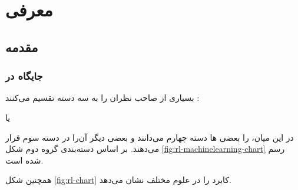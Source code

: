 \chapter{معرفی }\label{ch:rl}
\section{مقدمه}
\subsection{جایگاه  در }
بسیاری از صاحب نظران  را به سه دسته تقسیم می‌کنند :
\begin{enuminline}
	\item {}
	\item {} یا 
	\item {}
\end{enuminline}

در این میان،
را بعضی ها دسته چهارم می‌دانند و  بعضی دیگر آن‌را در دسته سوم قرار می‌دهند. بر اساس دسته‌بندی گروه دوم شکل 
\ref{fig:rl-machinelearning-chart}
رسم شده است.


همچنین شکل 
\ref{fig:rl-chart}
کابرد  را در علوم مختلف نشان می‌دهد.

